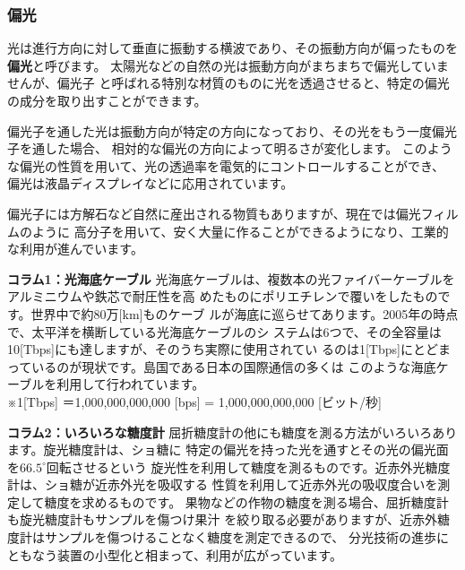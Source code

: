 \subsubsection{偏光}

光は進行方向に対して垂直に振動する横波であり、その振動方向が偏ったものを{\bf 偏光}と呼びます。
太陽光などの自然の光は振動方向がまちまちで偏光していませんが、偏光子
と呼ばれる特別な材質のものに光を透過させると、特定の偏光の成分を取り出すことができます。

偏光子を通した光は振動方向が特定の方向になっており、その光をもう一度偏光子を通した場合、
相対的な偏光の方向によって明るさが変化します。
このような偏光の性質を用いて、光の透過率を電気的にコントロールすることができ、
偏光は液晶ディスプレイなどに応用されています。

偏光子には方解石など自然に産出される物質もありますが、現在では偏光フィルムのように
高分子を用いて、安く大量に作ることができるようになり、工業的な利用が進んでいます。




\bigskip
\bigskip

\begin{itembox}[l]{\bf コラム1：光海底ケーブル}
光海底ケーブルは、複数本の光ファイバーケーブルをアルミニウムや鉄芯で耐圧性を高
めたものにポリエチレンで覆いをしたものです。世界中で約80万[km]ものケーブ
ルが海底に巡らせてあります。2005年の時点で、太平洋を横断している光海底ケーブルのシ
ステムは6つで、その全容量は10[Tbps]にも達しますが、そのうち実際に使用されてい
るのは1[Tbps]にとどまっているのが現状です。島国である日本の国際通信の多くは
このような海底ケーブルを利用して行われています。\\
 ※1[Tbps] ＝1,000,000,000,000 [bps] = 1,000,000,000,000 [ビット/秒] 
\end{itembox}

\bigskip

\begin{itembox}[l]{\bf コラム2：いろいろな糖度計}
屈折糖度計の他にも糖度を測る方法がいろいろあります。旋光糖度計は、ショ糖に
特定の偏光を持った光を通すとその光の偏光面を$66.5^\circ$回転させるという
旋光性を利用して糖度を測るものです。近赤外光糖度計は、ショ糖が近赤外光を吸収する
性質を利用して近赤外光の吸収度合いを測定して糖度を求めるものです。
果物などの作物の糖度を測る場合、屈折糖度計も旋光糖度計もサンプルを傷つけ果汁
を絞り取る必要がありますが、近赤外糖度計はサンプルを傷つけることなく糖度を測定できるので、
分光技術の進歩にともなう装置の小型化と相まって、利用が広がっています。
\end{itembox}

